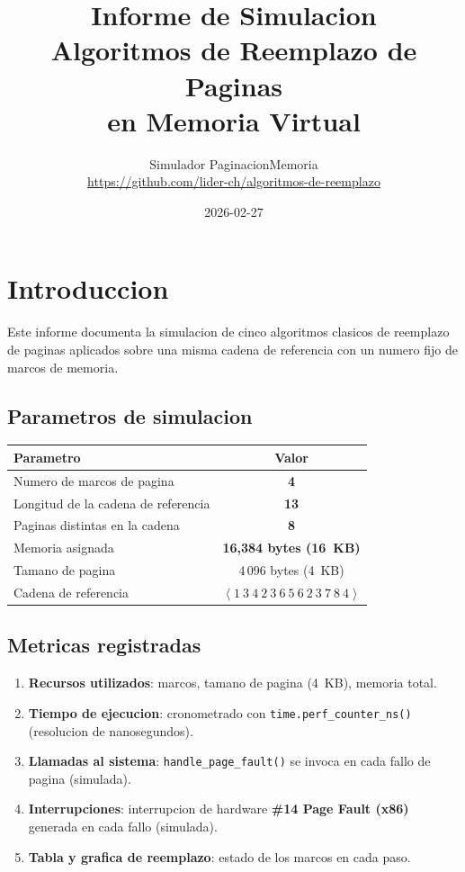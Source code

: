 \documentclass[12pt,a4paper]{article}
\title{\Huge\textbf{Informe de Simulacion}\\[0.8em]
\large Algoritmos de Reemplazo de Paginas\\en Memoria Virtual}
\author{Simulador PaginacionMemoria\\
\small\url{https://github.com/lider-ch/algoritmos-de-reemplazo}}
\date{2026-02-27}
\begin{document}
\maketitle
\tableofcontents
\newpage

\section{Introduccion}

Este informe documenta la simulacion de cinco algoritmos clasicos de
reemplazo de paginas aplicados sobre una misma cadena de referencia con
un numero fijo de marcos de memoria.

\subsection*{Parametros de simulacion}
\begin{center}
\begin{tabular}{|l|c|}
\hline
\rowcolor{accentcol!25}
\textbf{Parametro} & \textbf{Valor} \\
\hline
Numero de marcos de pagina & \textbf{4} \\
Longitud de la cadena de referencia & \textbf{13} \\
Paginas distintas en la cadena & \textbf{8} \\
Memoria asignada & \textbf{16,384 bytes (16~KB)} \\
Tamano de pagina & 4\,096 bytes (4~KB) \\
Cadena de referencia & $\langle\;1\ 3\ 4\ 2\ 3\ 6\ 5\ 6\ 2\ 3\ 7\ 8\ 4\;\rangle$ \\
\hline
\end{tabular}
\end{center}

\subsection*{Metricas registradas}
\begin{enumerate}
  \item \textbf{Recursos utilizados}: marcos, tamano de pagina (4~KB), memoria total.
  \item \textbf{Tiempo de ejecucion}: cronometrado con \texttt{time.perf\_counter\_ns()}
        (resolucion de nanosegundos).
  \item \textbf{Llamadas al sistema}: \texttt{handle\_page\_fault()} se invoca
        en cada fallo de pagina (simulada).
  \item \textbf{Interrupciones}: interrupcion de hardware \textbf{\#14 Page Fault (x86)}
        generada en cada fallo (simulada).
  \item \textbf{Tabla y grafica de reemplazo}: estado de los marcos en cada paso.
\end{enumerate}
\end{document}

